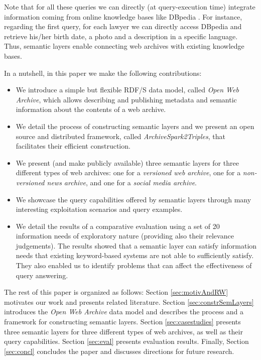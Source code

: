 \documentclass[twocolumn]{svjour3}
\newcommand{\tool}[0]{{\em ArchiveSpark2Triples}}
\begin{document}
Note that for all these queries we can directly (at query-execution time)
integrate information coming from online knowledge bases like DBpedia \cite{lehmann2015dbpedia}.
For instance, regarding the first query, for each lawyer
we can directly access DBpedia and
retrieve his/her birth date,
a photo and a description in a specific language.
Thus, semantic layers enable connecting
web archives with existing knowledge bases.

In a nutshell, in this paper we make the following contributions:
\begin{itemize}
\item   We introduce a simple but flexible RDF/S data model,
        called {\em Open Web Archive},
        which allows describing and publishing metadata and semantic information about
        the contents of a web archive.
\item   We detail the process
        of constructing semantic layers and
        we present an open source and distributed framework,
        called \tool, that
        facilitates their efficient construction.
\item   We present (and make publicly available)
        three semantic layers for three different types of web archives:
        one for a {\em  versioned web archive},
        one for a {\em non-versioned news archive},
        and one for a {\em social media archive}.
\item   We showcase the query capabilities offered by semantic layers
        through many interesting exploitation scenarios and query examples.
\item   We detail the results of a comparative evaluation using a set
        of 20 information needs of exploratory nature
        (providing also their relevance judgements).
        The results showed that a semantic layer can satisfy information
        needs that existing keyword-based systems
        are not able to sufficiently satisfy. They also enabled
        us to identify problems that can affect the effectiveness of
        query answering.
\end{itemize}


The rest of this paper is organized as follows:
Section \ref{sec:motivAndRW} motivates our work and presents
related literature.
Section \ref{sec:constrSemLayers} introduces the
{\em Open Web Archive} data model and describes
the process and a framework for constructing semantic layers.
Section \ref{sec:casestudies} presents three semantic layers
for three different types of web archives, as well as
their query capabilities.
Section \ref{sec:eval} presents evaluation results.
Finally, Section \ref{sec:concl} concludes the paper and
discusses directions
for future research.
\end{document}
